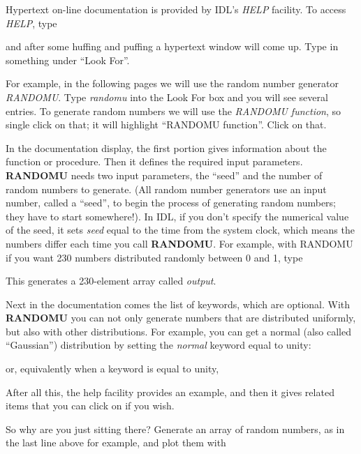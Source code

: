 \documentclass[psfig,preprint]{aastex}
\begin{document}
        Hypertext on-line documentation is provided by IDL's {\it HELP}
facility.  To access {\it HELP}, type


\noindent and after some huffing and puffing a hypertext window will
come up.  Type in something under
``Look For''. 

For example, in the following pages we will use the random number
generator {\it RANDOMU}.  Type {\it randomu} into the Look For box and
you will see several entries. To generate random numbers we will use
the {\it RANDOMU function}, so single click on that; it will highlight ``RANDOMU
function''.  Click on that.

	In the documentation display, the first portion gives
information about the function or procedure.  Then it defines the
required input parameters.  {\bf RANDOMU} needs two input parameters,
the ``seed'' and the number of random numbers to generate.  (All random
number generators use an input number, called a ``seed'', to begin the
process of generating random numbers; they have to start somewhere!). 
In IDL, if you don't specify the numerical value of the seed, it sets
{\it seed} equal to the time from the system clock, which means the
numbers differ each time you call {\bf RANDOMU}.  For example, with
RANDOMU if you want 230 numbers distributed randomly between 0 and 1,
type


\noindent This generates a 230-element array called {\it output}.

        Next in the documentation comes the list of keywords, which are
optional.  With {\bf RANDOMU} you can not only generate numbers that are
distributed uniformly, but also with other distributions.  For example,
you can get a normal (also called ``Gaussian'') distribution by setting
the {\it normal} keyword equal to unity:


\noindent or, equivalently when a keyword is equal to unity,


\noindent After all this, the help facility provides an example, and
then it gives related items that you can click on if you wish.

	So why are you just sitting there? Generate an array of random
numbers, as in the last line above for example, and plot them with
\end{document}
